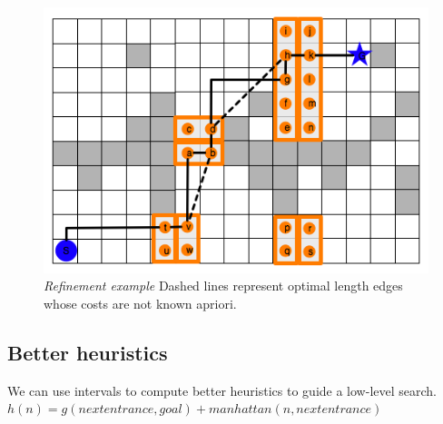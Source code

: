 \begin{figure}[htbp]
	\vspace{-9pt}
	\caption{\emph{Refinement example} Dashed lines represent optimal length edges whose costs are not known apriori.}
       \begin{center}
          \includegraphics[scale=0.35, trim = 20mm 9mm 20mm 0mm]{diagrams/refinementexample.png}
       \end{center}
       \label{ia-fig:refinement}
	\vspace{-6pt}
\end{figure}

\subsection{Better heuristics}
We can use intervals to compute better heuristics to guide a low-level search.
$h(n) = g(nextentrance, goal) + manhattan(n, nextentrance)$

